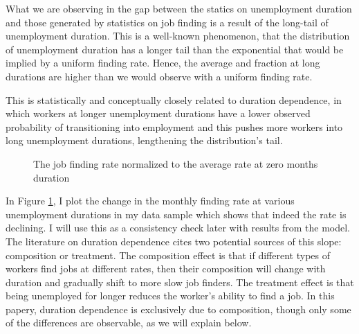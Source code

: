 \documentclass[12pt]{article}
\newcommand{\highlightP}[1]{{\emph{\color{MyPink}{#1}}}}
\theoremstyle{definition}
\begin{document}
What we are observing in the gap between the statics on unemployment duration and those generated by statistics on job finding is a result of the long-tail of unemployment duration. This is a well-known phenomenon, that the distribution of unemployment duration has a longer tail than the exponential that would be implied by a uniform finding rate. Hence, the average and fraction at long durations are higher than we would observe with a uniform finding rate.

This is statistically and conceptually closely related to duration dependence, in which workers at longer unemployment durations have a lower observed probability of transitioning into employment and this pushes more workers into long unemployment durations, lengthening the distribution's tail. \highlightP{Thus, when we look for factors that will skew upwards the distribution of unemployment duration, we would also be looking for how it affects the relationship between finding rate and unemployment duration.}

\begin{figure}[H]
    \noindent\caption{The job finding rate normalized to the average rate at zero months duration}
    \begin{center}
        \label{wiczerLongTermUnemploymentAttached2015_fig3}
    \end{center}
\end{figure}

In Figure \ref{wiczerLongTermUnemploymentAttached2015_fig3}, I plot the change in the monthly finding rate at various unemployment durations in my data sample which shows that indeed the rate is declining. I will use this as a consistency check later with results from the model. The literature on duration dependence cites two potential sources of this slope: composition or treatment. The composition effect is that if different types of workers find jobs at different rates, then their composition will change with duration and gradually shift to more slow job finders. The treatment effect is that being unemployed for longer reduces the worker's ability to find a job. In this papery, duration dependence is exclusively due to composition, though only some of the differences are observable, as we will explain below.
\end{document}
